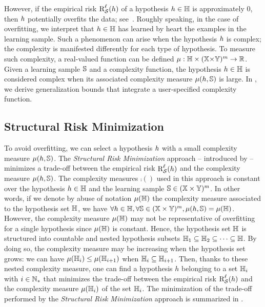 However, if the empirical risk $\RiskLoss_{\dS}(\h)$ of a hypothesis $\h\in\H$ is approximately $0$, then $\h$ potentially overfits the data; see~.
Roughly speaking, in the case of overfitting, we interpret that $\h\in\H$ has learned by heart the examples in the learning sample.
Such a phenomenon can arise when the hypothesis $\h$ is complex; the complexity is manifested differently for each type of hypothesis.
To measure such complexity, a real-valued function can be defined $\comp: \H\times (\X{\times}\Y)^\m \to \Rbb$.
Given a learning sample $\S$ and a complexity function, the hypothesis $\h\in\H$ is considered complex when its associated complexity measure $\comp(\h, \S)$ is large.
In , we derive generalization bounds that integrate a user-specified complexity function.

\subsection{Structural Risk Minimization}

To avoid overfitting, we can select a hypothesis $\h$ with a small complexity measure $\comp(\h, \S)$. 
The {\it Structural Risk Minimization} approach -- introduced by \citet{VapnikChervonenkis1974} -- minimizes a trade-off between the empirical risk $\RiskLoss_{\dS}(\h)$ and the complexity measure $\comp(\h, \S)$.
The complexity measures $\comp()$ used in this approach is constant over the hypothesis $\h\in\H$ and the learning sample $\S\in(\X\times\Y)^\m$.
In other words, if we denote by abuse of notation $\comp(\H)$ the complexity measure associated to the hypothesis set $\H$, we have $\forall \h\in\H, \forall \S\in(\X\times\Y)^\m, \comp(\h,\S) = \comp(\H)$.
However, the complexity measure $\comp(\H)$ may not be representative of overfitting for a single hypothesis since $\comp(\H)$ is constant.
Hence, the hypothesis set $\H$ is structured into countable and nested hypothesis subsets $\H_1 \subseteq \H_2 \subseteq \dots \subseteq \H$.
By doing so, the complexity measure may be increasing when the hypothesis set grows: we can have $\comp(\H_i)\le\comp(\H_{i+1})$ when $\H_i\subseteq\H_{i+1}$. 
Then, thanks to these nested complexity measure, one can find a hypothesis $h$ belonging to a set $\H_i$ with $i\in\Nbb_*$ that minimizes the trade-off between the empirical risk $\RiskLoss_{\dS}(\h)$ and the complexity measure $\comp(\H_i)$ of the set $\H_i$. 
The minimization of the trade-off performed by the {\it Structural Risk Minimization} approach is summarized in .

